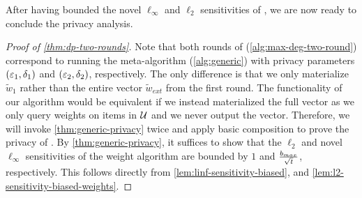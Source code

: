 After having bounded the novel $\ell_\infty$ and $\ell_2$ sensitivities of \ouralgo{}, we are now ready to conclude the privacy analysis.
\begin{proof}[Proof of \cref{thm:dp-two-rounds}]
Note that both rounds of \ouralgotworounds{} (\cref{alg:max-deg-two-round}) correspond to running the \selectalgo{} meta-algorithm (\cref{alg:generic}) with privacy parameters $(\varepsilon_1, \delta_1)$ and $(\varepsilon_2, \delta_2)$, respectively.
The only difference is that we only materialize $\tilde{w}_1$ rather than the entire vector $\tilde{w}_{ext}$ from the first round. The functionality of our algorithm would be equivalent if we instead materialized the full vector as we only query weights on items in $\mathcal{U}$ and we never output the vector.
Therefore, we will invoke \cref{thm:generic-privacy} twice and apply basic composition to prove the privacy of \ouralgotworounds{}.
By \cref{thm:generic-privacy}, it suffices to show that the $\ell_2$ and novel $\ell_\infty$ sensitivities of the weight algorithm \ouralgo{} are bounded by $1$ and $\frac{b_{max}}{\sqrt{t}}$, respectively.
This follows directly from \cref{lem:linf-sensitivity-biased}, and \cref{lem:l2-sensitivity-biased-weights}.
\end{proof}



